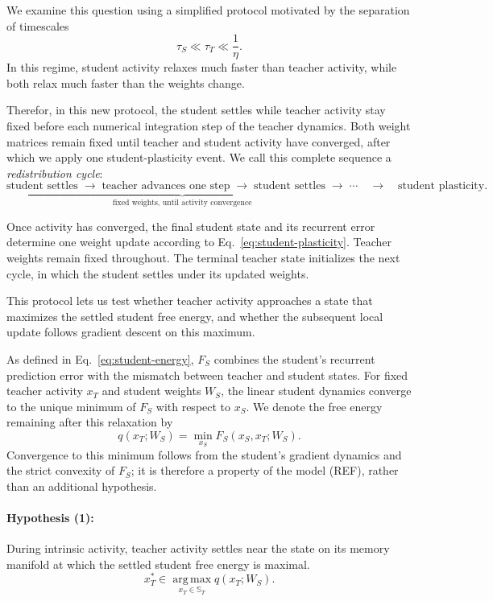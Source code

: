 \documentclass[10pt,letterpaper]{article}
\theoremstyle{plain}
\theoremstyle{remark}
\begin{document}
We examine this question using a simplified protocol motivated by the separation of timescales
\begin{equation}
\tau_S\ll\tau_T\ll\frac{1}{\eta}.
\label{eq:empirical-timescale-separation}
\end{equation}
In this regime, student activity relaxes much faster than teacher activity, while both relax much faster than the weights change.

Therefor, in this new protocol, the student settles while teacher activity stay fixed before each numerical integration step of the teacher dynamics. Both weight matrices remain fixed until teacher and student activity have converged, after which we apply one student-plasticity event. We call this complete sequence a \emph{redistribution cycle}:
\[
\underbrace{
\text{student settles}\;\longrightarrow\;\text{teacher advances one step}
\;\longrightarrow\;\text{student settles}\;\longrightarrow\;\cdots
}_{\text{fixed weights, until activity convergence}}
\quad\longrightarrow\quad\text{student plasticity}.
\]

Once activity has converged, the final student state and its recurrent error determine one weight update according to Eq.~\eqref{eq:student-plasticity}. Teacher weights remain fixed throughout. The terminal teacher state initializes the next cycle, in which the student settles under its updated weights.

This protocol lets us test whether teacher activity approaches a state that maximizes the settled student free energy, and whether the subsequent local update follows gradient descent on this maximum.

As defined in Eq.~\eqref{eq:student-energy}, \(F_S\) combines the student's recurrent prediction error with the mismatch between teacher and student states. For fixed teacher activity \(x_T\) and student weights \(W_S\), the linear student dynamics converge to the unique minimum of \(F_S\) with respect to \(x_S\). We denote the free energy remaining after this relaxation by
\begin{equation}
q(x_T;W_S)=\min_{x_S}F_S(x_S,x_T;W_S).
\label{eq:empirical-settled-cost}
\end{equation}
Convergence to this minimum follows from the student’s gradient dynamics and the strict convexity of \(F_S\); it is therefore a property of the model (REF), rather than an additional hypothesis.

\paragraph{Hypothesis (1):} During intrinsic activity, teacher activity settles near the state on its memory manifold at which the settled student free energy is maximal.
\begin{equation}
x_T^*\in\operatorname*{arg\,max}_{x_T\in\mathbb S_T}q(x_T;W_S).
\label{eq:empirical-selection-hypothesis}
\end{equation}
\end{document}
